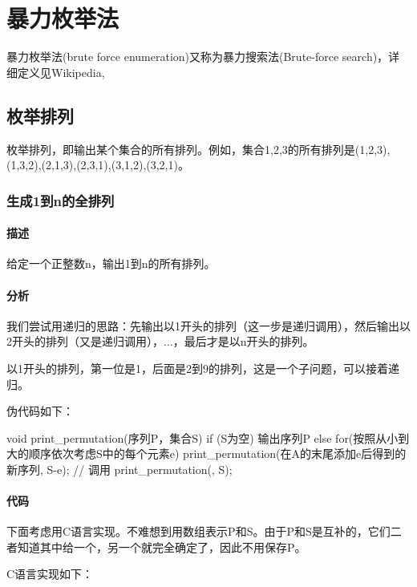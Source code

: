 \chapter{暴力枚举法}
暴力枚举法(brute force enumeration)又称为暴力搜索法(Brute-force search)，详细定义见Wikipedia, 

\section{枚举排列} %
枚举排列，即输出某个集合的所有排列。例如，集合{1,2,3}的所有排列是{(1,2,3),(1,3,2),(2,1,3),(2,3,1),(3,1,2),(3,2,1)}。

\subsection{生成1到n的全排列}

\subsubsection{描述}
给定一个正整数n，输出1到n的所有排列。

\subsubsection{分析}
我们尝试用递归的思路：先输出以1开头的排列（这一步是递归调用），然后输出以2开头的排列（又是递归调用），...，最后才是以n开头的排列。

以1开头的排列，第一位是1，后面是2到9的排列，这是一个子问题，可以接着递归。

伪代码如下：
\begin{Code}
void print_permutation(序列P，集合S) {
    if (S为空) 输出序列P
    else {
        for(按照从小到大的顺序依次考虑S中的每个元素e) {
            print_permutation(在A的末尾添加e后得到的新序列, S-{e});
        }
    }
}
// 调用
print_permutation({}, S);
\end{Code}

\subsubsection{代码}
下面考虑用C语言实现。不难想到用数组表示P和S。由于P和S是互补的，它们二者知道其中给一个，另一个就完全确定了，因此不用保存P。

C语言实现如下：

